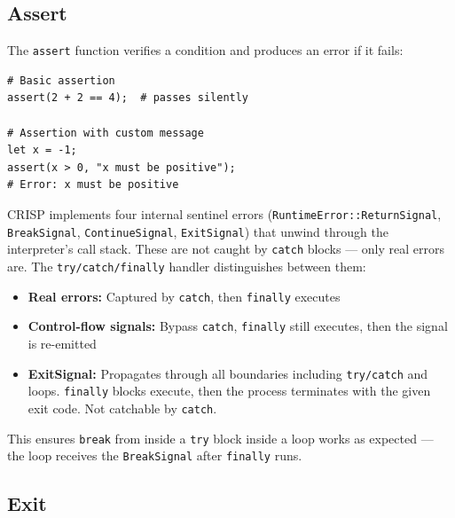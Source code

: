 \subsection{Assert}

The \texttt{assert} function verifies a condition and produces an error if it fails:

\begin{tcolorbox}[colback=codebg, colframe=darkpurple, colbacktitle=darkpurple, title=\textbf{\textcolor{codegold}{Assert}}, fonttitle=\bfseries, sharp corners]
\begin{lstlisting}
# Basic assertion
assert(2 + 2 == 4);  # passes silently

# Assertion with custom message
let x = -1;
assert(x > 0, "x must be positive");
# Error: x must be positive
\end{lstlisting}
\end{tcolorbox}

\begin{tcolorbox}[colback=lightlavender, colframe=softvioletdark, title=\textbf{\textcolor{darkpurple}{Design Note: Error Signals}}, fonttitle=\bfseries, sharp corners]
CRISP implements four internal sentinel errors (\texttt{RuntimeError::ReturnSignal}, 
\texttt{BreakSignal}, \texttt{ContinueSignal}, \texttt{ExitSignal}) that unwind 
through the interpreter's call stack. These are not caught by \texttt{catch} blocks — 
only real errors are. The \texttt{try/catch/finally} handler distinguishes between them:
\begin{itemize}
    \item \textbf{Real errors:} Captured by \texttt{catch}, then \texttt{finally} executes
    \item \textbf{Control-flow signals:} Bypass \texttt{catch}, \texttt{finally} still executes, then the signal is re-emitted
    \item \textbf{ExitSignal:} Propagates through all boundaries including
    \texttt{try/catch} and loops. \texttt{finally} blocks execute, then the
    process terminates with the given exit code. Not catchable by \texttt{catch}.
\end{itemize}
This ensures \texttt{break} from inside a \texttt{try} block inside a loop works as expected — the loop receives the \texttt{BreakSignal} after \texttt{finally} runs.
\end{tcolorbox}

\subsection{Exit}

